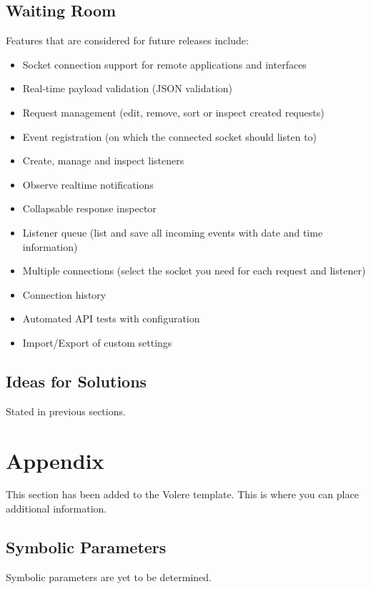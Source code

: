 \documentclass[12pt, titlepage]{article}
\begin{document}
\subsection{Waiting Room}
Features that are considered for future releases include:
\begin{itemize}
	\item Socket connection support for remote applications and interfaces 
	\item Real-time payload validation (JSON validation)
	\item Request management (edit, remove, sort or inspect created requests)
	\item Event registration (on which the connected socket should listen to)
	\item Create, manage and inspect listeners
	\item Observe realtime notifications
	\item Collapsable response inspector
	\item Listener queue (list and save all incoming events with date and time information)
	\item Multiple connections (select the socket you need for each request and listener)
	\item Connection history
	\item Automated API tests with configuration
	\item Import/Export of custom settings
\end{itemize}
\subsection{Ideas for Solutions}
Stated in previous sections.





\newpage

\section{Appendix}
This section has been added to the Volere template.  This is where you can place
additional information.

\subsection{Symbolic Parameters}

Symbolic parameters are yet to be determined.
\end{document}
